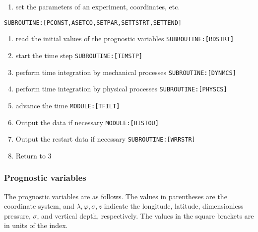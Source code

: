 \begin{enumerate}
\def\labelenumi{\arabic{enumi}.}
\tightlist
\item
  set the parameters of an experiment, coordinates, etc.
\end{enumerate}

\texttt{SUBROUTINE:{[}PCONST,ASETCO,SETPAR,SETTSTRT,SETTEND{]}}

\begin{enumerate}
\def\labelenumi{\arabic{enumi}.}
\setcounter{enumi}{1}
\item
  read the initial values of the prognostic variables
  \texttt{SUBROUTINE:{[}RDSTRT{]}}
\item
  start the time step \texttt{SUBROUTINE:{[}TIMSTP{]}}
\item
  perform time integration by mechanical processes
  \texttt{SUBROUTINE:{[}DYNMCS{]}}
\item
  perform time integration by physical processes
  \texttt{SUBROUTINE:{[}PHYSCS{]}}
\item
  advance the time \texttt{MODULE:{[}TFILT{]}}
\item
  Output the data if necessary \texttt{MODULE:{[}HISTOU{]}}
\item
  Output the restart data if necessary \texttt{SUBROUTINE:{[}WRRSTR{]}}
\item
  Return to 3
\end{enumerate}

\hypertarget{prognostic-variables}{%
\subsubsection{Prognostic variables}\label{prognostic-variables}}

The prognostic variables are as follows. The values in parentheses are
the coordinate system, and \(\lambda,\varphi,\sigma, z\) indicate the
longitude, latitude, dimensionless pressure, \(\sigma\), and vertical
depth, respectively. The values in the square brackets are in units of
the index.

